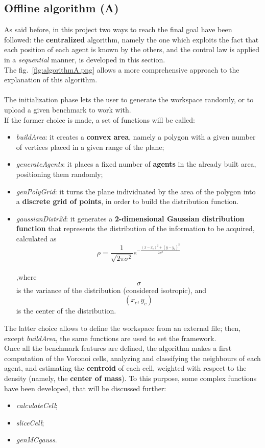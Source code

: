 \documentclass[a4paper,11pt,oneside]{book}
\begin{document}
	\subsection{Offline algorithm (A)}
	
	As said before, in this project two ways to reach the final goal have been followed: the \textbf{centralized} algorithm, namely the one which exploits the fact that each position of each agent is known by the others, and the control law is applied in a \textit{sequential} manner, is developed in this section.\\
The fig.~\ref{fig:algorithmA.png} allows a more comprehensive approach to the explanation of this algorithm.\\\\
The initialization phase lets the user to generate the workspace randomly, or to upload a given benchmark to work with. \\
If the former choice is made, a set of functions will be called:
 \begin{itemize}
		\item \textit{buildArea}: it creates a \textbf{convex area}, namely a polygon with a given number of vertices placed in a given range of the plane;
		\item \textit{generateAgents}: it places a fixed number of \textbf{agents} in the already built area, positioning them randomly;
		\item \textit{genPolyGrid}: it turns the plane individuated by the area of the polygon into a \textbf{discrete grid of points}, in order to build the distribution function.  
		\item \textit{gaussianDistr2d}: it generates a \textbf{2-dimensional Gaussian distribution function} that represents the distribution of the information to be acquired, calculated as $$\rho=\frac{1}{\sqrt{2\pi\sigma^2}}e^{-\frac{(x-x_{c})^2+(y-y_{c})^2}{2\sigma^2}} $$\\
		,where $$\sigma$$ is the variance of the distribution (considered isotropic), and $$(x_{c},y_{c})$$ is the center of the distribution.  \\
\end {itemize}
The latter choice allows to define the workspace from an external file; then, except \textit{buildArea}, the same functions are used to set the framework.\\

Once all the benchmark features are defined, the algorithm makes a first computation of the Voronoi cells, analyzing and classifying the neighbours of each agent, and estimating the \textbf{centroid} of each cell, weighted with respect to the density (namely, the \textbf{center of mass}). To this purpose, some complex functions have been developed, that will be discussed further:
\begin{itemize}
	\item \textit{calculateCell};
	\item \textit{sliceCell};
	\item \textit{genMCgauss}.
\end{itemize}
\end{document}
